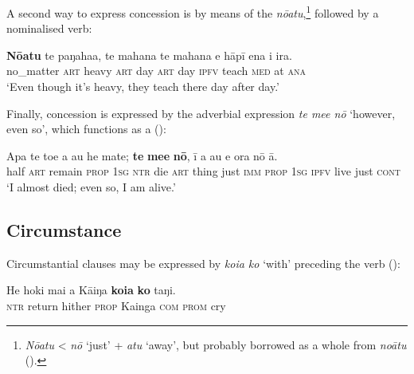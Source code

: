 A second way to express concession is by means of the  \textit{nōatu},\footnote{\label{fn:537}\textit{Nōatu} {\textless} \textit{nō} ‘just’ + \textit{atu} ‘away’, but probably borrowed as a whole from  \textit{noātu} (\citealt[310]{AcadémieTahitienne1986}).} followed by a nominalised verb:

\ea\label{ex:11.269}
\gll \textbf{Nōatu} te paŋaha{\ꞌ}a, te mahana te mahana e hāpī ena {\ꞌ}i ira.\\
no\_matter \textsc{art} heavy \textsc{art} day \textsc{art} day \textsc{ipfv} teach \textsc{med} at \textsc{ana}\\

\glt 
‘Even though it's heavy, they teach there day after day.’ \textstyleExampleref{[R537.023]} 
\z

Finally, concession is expressed by the adverbial expression \textit{te me{\ꞌ}e nō} ‘however, even so’, which functions as a  ():

\ea\label{ex:11.270}
\gll {\ꞌ}Apa te toe a au he mate; \textbf{te} \textbf{me{\ꞌ}e} \textbf{nō}, {\ꞌ}ī a au e ora nō {\ꞌ}ā.\\
half \textsc{art} remain \textsc{prop} \textsc{1sg} \textsc{ntr} die \textsc{art} thing just \textsc{imm} \textsc{prop} \textsc{1sg} \textsc{ipfv} live just \textsc{cont}\\

\glt 
‘I almost died; even so, I am alive.’ \textstyleExampleref{[R437.050]}\textstyleExampleref{} 
\z
{}

\subsection{Circumstance}\label{sec:11.6.8}
Circumstantial clauses may be expressed by \textit{koia ko} ‘with’ preceding the verb ():


\ea\label{ex:11.271}
\gll He hoki mai a Kāiŋa \textbf{koia} \textbf{ko} taŋi.\\
\textsc{ntr} return hither \textsc{prop} Kainga \textsc{com} \textsc{prom} cry\\


